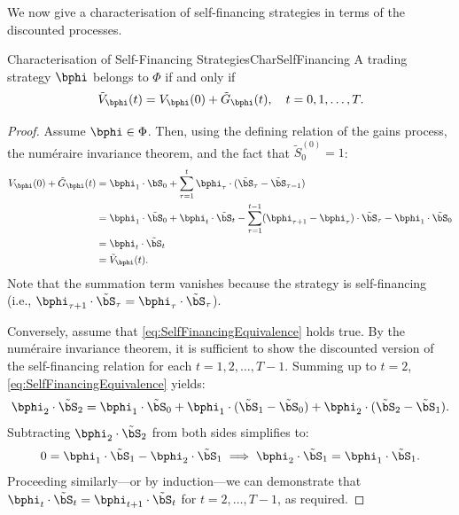 We now give a characterisation of self-financing strategies in terms of the discounted processes.

\begin{prop}{Characterisation of Self-Financing Strategies}{CharSelfFinancing}
	A trading strategy $\bphi$ belongs to $\Phi$ if and only if
	\begin{equation} \label{eq:SelfFinancingEquivalence}
		\tilde{V}_{\bphi}(t) = V_{\bphi}(0) + \tilde{G}_{\bphi}(t), \quad t = 0, 1, \dots, T.
	\end{equation}
\end{prop}

\begin{proof}
	Assume $\bphi \in \Phi$. Then, using the defining relation of the gains process, the num\'{e}raire invariance theorem, and the fact that $\tilde{S}_0^{(0)} = 1$:
	\begin{align*}
		V_{\bphi}(0) + \tilde{G}_{\bphi}(t) & = \bphi_1 \cdot \bS_0 + \sum_{\tau=1}^t \bphi_\tau \cdot (\tilde{\bS}_\tau - \tilde{\bS}_{\tau-1})                                                                   \\
		                                    & = \bphi_1 \cdot \tilde{\bS}_0 + \bphi_t \cdot \tilde{\bS}_t - \sum_{\tau=1}^{t-1} (\bphi_{\tau+1} - \bphi_\tau) \cdot \tilde{\bS}_\tau - \bphi_1 \cdot \tilde{\bS}_0 \\
		                                    & = \bphi_t \cdot \tilde{\bS}_t                                                                                                                                        \\
		                                    & = \tilde{V}_{\bphi}(t).
	\end{align*}
	Note that the summation term vanishes because the strategy is self-financing (i.e., $\bphi_{\tau+1} \cdot \tilde{\bS}_\tau = \bphi_\tau \cdot \tilde{\bS}_\tau$).

	Conversely, assume that \cref{eq:SelfFinancingEquivalence} holds true. By the num\'{e}raire invariance theorem, it is sufficient to show the discounted version of the self-financing relation for each $t = 1, 2, \dots, T-1$. Summing up to $t=2$, \cref{eq:SelfFinancingEquivalence} yields:
	\begin{equation*}
		\bphi_2 \cdot \tilde{\bS}_2 = \bphi_1 \cdot \tilde{\bS}_0 + \bphi_1 \cdot (\tilde{\bS}_1 - \tilde{\bS}_0) + \bphi_2 \cdot (\tilde{\bS}_2 - \tilde{\bS}_1).
	\end{equation*}
	Subtracting $\bphi_2 \cdot \tilde{\bS}_2$ from both sides simplifies to:
	\begin{equation*}
		0 = \bphi_1 \cdot \tilde{\bS}_1 - \bphi_2 \cdot \tilde{\bS}_1 \implies \bphi_2 \cdot \tilde{\bS}_1 = \bphi_1 \cdot \tilde{\bS}_1.
	\end{equation*}
	Proceeding similarly---or by induction---we can demonstrate that $\bphi_t \cdot \tilde{\bS}_t = \bphi_{t+1} \cdot \tilde{\bS}_t$ for $t = 2, \dots, T-1$, as required.
\end{proof}

